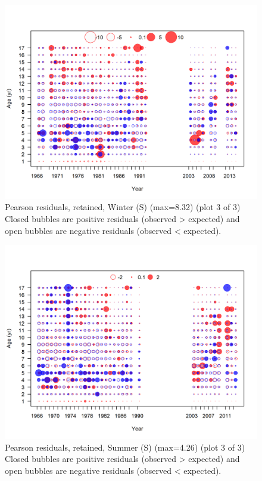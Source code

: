 \documentclass[12pt,]{article}
\begin{document}
\begin{figure}
\centering
\includegraphics{r4ss/plots_mod1/comp_agefit_residsflt3mkt2_page3.png}
\caption{Pearson residuals, retained, Winter (S) (max=8.32) (plot 3 of
3)\\
Closed bubbles are positive residuals (observed \textgreater{} expected)
and open bubbles are negative residuals (observed \textless{} expected).
\label{fig:ws_age_pearson}}
\end{figure}

\begin{figure}
\centering
\includegraphics{r4ss/plots_mod1/comp_agefit_residsflt4mkt2_page3.png}
\caption{Pearson residuals, retained, Summer (S) (max=4.26) (plot 3 of
3)\\
Closed bubbles are positive residuals (observed \textgreater{} expected)
and open bubbles are negative residuals (observed \textless{} expected).
\label{fig:ss_age_pearson}}
\end{figure}
\end{document}
